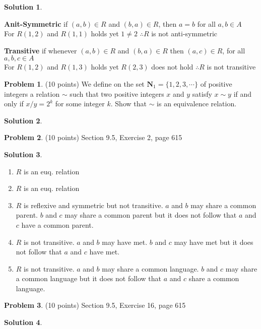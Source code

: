 \documentclass{article}
\theoremstyle{definition}
\newtheorem{problem}{Problem}
\newtheorem*{solution}{Solution}
\newcommand{\N}{\mathbf{N}}
\begin{document}
\begin{solution}
\begin{enumerate}[label=(\alph*)]
      \textbf{Anit-Symmetric} if $(a,b) \in R$ and $(b,a) \in R$, then $a=b$ for all $a,b \in A$ \\
      For $R(1,2)$ and $R(1,1)$ holds yet $1 \neq 2$
      $\therefore R$ is not anti-symmetric 
    
      \textbf{Transitive} if whenever $(a,b) \in R$ and $(b,a) \in R$ then $(a,c) \in R$, for all $a,b,c \in A$ \\
      For $R(1,2)$ and $R(1,3)$ holds yet $R(2,3)$ does not hold
      $\therefore R$ is not transitive

  \end{enumerate}
\end{solution}

\begin{problem} (10 points)
We define on the set $\N_1=\{1,2,3,\cdots\}$ of positive integers a
relation $\sim$ such that two positive integers $x$ and $y$ satisfy
$x\sim y$ if and only if $x/y=2^k$ for some integer $k$. 
Show that $\sim$ is an equivalence relation.
\end{problem}
\begin{solution} 
\end{solution}

\begin{problem} (10 points)
Section 9.5, Exercise 2, page 615
\end{problem}
\begin{solution} \ \\
  \begin{enumerate}[label=(\alph*)]
    \item $R$ is an euq. relation
    \item $R$ is an euq. relation
    \item $R$ is reflexive and symmetric but not transitive. $a$ and $b$ may share a common parent. $b$ and $c$ may share a common parent but it does not follow that $a$ and $c$ have a common parent.
    \item $R$ is not transitive. $a$ and $b$ may have met. $b$ and $c$ may have met but it does not follow that $a$ and $c$ have met.
    \item $R$ is not transitive. $a$ and $b$ may share a common language. $b$ and $c$ may share a common language but it does not follow that $a$ and $c$ share a common language.
  \end{enumerate}
\end{solution}

\begin{problem} (10 points)
Section 9.5, Exercise 16, page 615
\end{problem}
\begin{solution} 
\end{solution}
\end{document}
